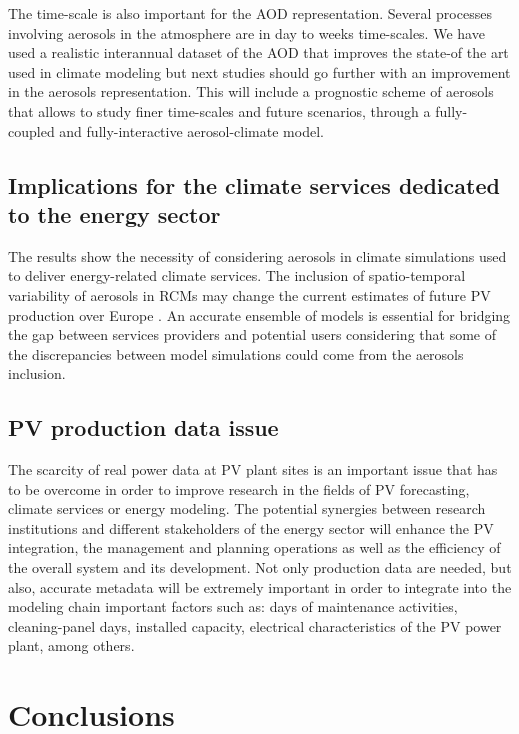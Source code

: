 The time-scale is also important for the AOD representation. Several processes involving aerosols in the atmosphere are in day to weeks time-scales. We have used a realistic interannual dataset of the AOD that improves the state-of the art used in climate modeling but next studies should go further with an improvement in the aerosols representation. This will include a prognostic scheme of aerosols that allows to study finer time-scales and future scenarios, through a fully-coupled and fully-interactive aerosol-climate model. 
  

\subsection{Implications for the climate services dedicated to the energy sector }

The results show the necessity of considering aerosols in climate simulations used to deliver energy-related climate services. The inclusion of spatio-temporal variability of aerosols in RCMs may change the current estimates of future PV production over Europe \cite*{Jerez2015}. An accurate ensemble of models is essential for bridging the gap between services providers and potential users considering that some of the discrepancies between model simulations could come from the aerosols inclusion.

\subsection{PV production data issue}

The scarcity of real power data at PV plant sites is an important issue that has to be overcome in order to improve research in the fields of PV forecasting, climate services or energy modeling. The potential synergies between research institutions and different stakeholders of the energy sector will enhance the PV integration, the management and planning operations as well as the efficiency of the overall system and its development. Not only production data are needed, but also, accurate metadata will be extremely important in order to integrate into the modeling chain important factors such as: days of maintenance activities, cleaning-panel days, installed capacity, electrical characteristics of the PV power plant, among others.

\section{Conclusions}

